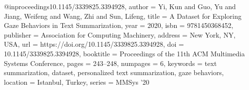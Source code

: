 @inproceedings{10.1145/3339825.3394928,
author = {Yi, Kun and Guo, Yu and Jiang, Weifeng and Wang, Zhi and Sun, Lifeng},
title = {A Dataset for Exploring Gaze Behaviors in Text Summarization},
year = {2020},
isbn = {9781450368452},
publisher = {Association for Computing Machinery},
address = {New York, NY, USA},
url = {https://doi.org/10.1145/3339825.3394928},
doi = {10.1145/3339825.3394928},
booktitle = {Proceedings of the 11th ACM Multimedia Systems Conference},
pages = {243–248},
numpages = {6},
keywords = {text summarization, dataset, personalized text summarization, gaze behaviors},
location = {Istanbul, Turkey},
series = {MMSys ’20}
}
  
